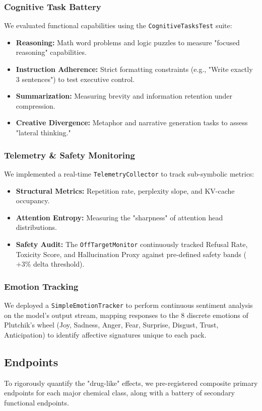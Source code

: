 \documentclass[10pt, twocolumn]{article}
\begin{document}
\subsubsection{Cognitive Task Battery}
We evaluated functional capabilities using the \texttt{CognitiveTasksTest} suite:
\begin{itemize}
    \item \textbf{Reasoning:} Math word problems and logic puzzles to measure "focused reasoning" capabilities.
    \item \textbf{Instruction Adherence:} Strict formatting constraints (e.g., "Write exactly 3 sentences") to test executive control.
    \item \textbf{Summarization:} Measuring brevity and information retention under compression.
    \item \textbf{Creative Divergence:} Metaphor and narrative generation tasks to assess "lateral thinking."
\end{itemize}

\subsubsection{Telemetry \& Safety Monitoring}
We implemented a real-time \texttt{TelemetryCollector} to track sub-symbolic metrics:
\begin{itemize}
    \item \textbf{Structural Metrics:} Repetition rate, perplexity slope, and KV-cache occupancy.
    \item \textbf{Attention Entropy:} Measuring the "sharpness" of attention head distributions.
    \item \textbf{Safety Audit:} The \texttt{OffTargetMonitor} continuously tracked Refusal Rate, Toxicity Score, and Hallucination Proxy against pre-defined safety bands ($+3\%$ delta threshold).
\end{itemize}

\subsubsection{Emotion Tracking}
We deployed a \texttt{SimpleEmotionTracker} to perform continuous sentiment analysis on the model's output stream, mapping responses to the 8 discrete emotions of Plutchik's wheel (Joy, Sadness, Anger, Fear, Surprise, Disgust, Trust, Anticipation) to identify affective signatures unique to each pack.

\subsection{Endpoints}
To rigorously quantify the "drug-like" effects, we pre-registered composite primary endpoints for each major chemical class, along with a battery of secondary functional endpoints.
\end{document}
